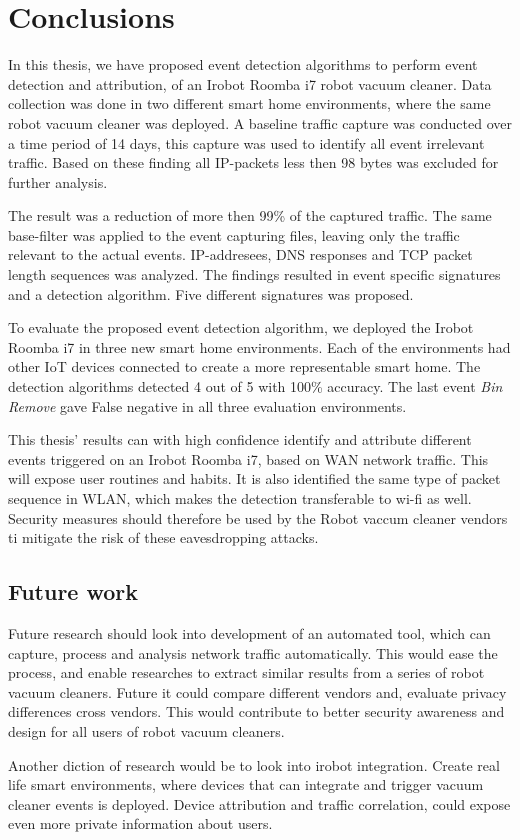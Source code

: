 \chapter{Conclusions}
In this thesis, we have proposed event detection algorithms to perform event detection and attribution, of an Irobot Roomba i7 robot vacuum cleaner. Data collection was done in two different smart home environments, where the same robot vacuum cleaner was deployed. A baseline traffic capture was conducted over a time period of 14 days, this capture was used to identify all event irrelevant traffic. Based on these finding all IP-packets less then 98 bytes was excluded for further analysis.  

The result was a reduction of more then 99\% of the captured traffic. The same base-filter was applied to the event capturing files, leaving only the traffic relevant to the actual events. IP-addresees, DNS responses and TCP packet length sequences was analyzed. The findings resulted in event specific signatures and a detection algorithm. Five different signatures was proposed. 

To evaluate the proposed event detection algorithm, we deployed the Irobot Roomba i7 in three new smart home environments. Each of the environments had other IoT devices connected to create a more representable smart home. The detection algorithms detected 4 out of 5 with 100\% accuracy. The last event \textit{Bin Remove} gave False negative in all three evaluation environments.

This thesis' results can with high confidence identify and attribute different events triggered on an Irobot Roomba i7, based on WAN network traffic. This will expose user routines and habits. It is also identified the same type of packet sequence in WLAN, which makes the detection transferable to wi-fi as well. Security measures should therefore be used by the Robot vaccum cleaner vendors ti mitigate the risk of these eavesdropping attacks. 

\section{Future work}
Future research should look into development of an automated tool, which can capture, process and analysis network traffic automatically. This would ease the process, and enable researches to extract similar results from a series of robot vacuum cleaners. Future it could compare different vendors and, evaluate privacy differences cross vendors. This would contribute to better security awareness and design for all users of robot vacuum cleaners. 

Another diction of research would be to look into irobot integration. Create real life smart environments, where devices that can integrate and trigger vacuum cleaner events is deployed. Device attribution and traffic correlation, could expose even more private information about users.   







